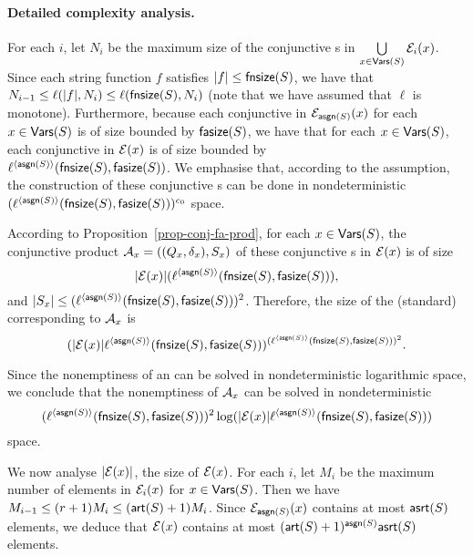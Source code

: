 \paragraph{Detailed complexity analysis.}
For each $i$, 
let $N_i$ be the maximum size of the conjunctive \FA{}s in $\bigcup \limits_{x \in \mathsf{Vars}(S)} \mathcal{E}_i(x)$.
Since each string function $f$ satisfies $|f| \le \mathsf{fnsize}(S)$, we have that $N_{i-1} \le \ell(|f|, N_i) \le \ell(\mathsf{fnsize}(S), N_i)$ (note that we have assumed that $\ell$ is monotone). Furthermore, because each conjunctive \FA{} in $\mathcal{E}_{\mathsf{asgn}(S)}(x)$ for each $x \in \mathsf{Vars}(S)$ is of size bounded by $\mathsf{fasize}(S)$, we have 
    that for each $x \in \mathsf{Vars}(S)$, each conjunctive \FA{} in $\mathcal{E}(x)$ is of
    size bounded by \\ $\ell^{\langle \mathsf{asgn}(S) \rangle}(\mathsf{fnsize}(S), \mathsf{fasize}(S))$. 
%
We emphasise that, according to the \prerec{} assumption, the construction of these conjunctive \FA{}s can be done in nondeterministic $(\ell^{\langle \mathsf{asgn}(S) \rangle}(\mathsf{fnsize}(S), \mathsf{fasize}(S)))^{c_0}$ space. 

According to Proposition~\ref{prop-conj-fa-prod}, for each $x \in \mathsf{Vars}(S)$, the conjunctive product \FA{} $\mathcal{A}_x=((Q_x, \delta_x), S_x)$ of these conjunctive \FA{}s  in $\mathcal{E}(x)$ is of size 
    $$|\mathcal{E}(x)|(\ell^{\langle \mathsf{asgn}(S) \rangle}(\mathsf{fnsize}(S), \mathsf{fasize}(S))),$$
and $|S_x| \le (\ell^{\langle \mathsf{asgn}(S) \rangle}(\mathsf{fnsize}(S), \mathsf{fasize}(S)))^2$. Therefore, the size of the (standard) \FA{} corresponding to $\mathcal{A}_x$ is 
    $$(|\mathcal{E}(x)| \ell^{\langle \mathsf{asgn}(S) \rangle}(\mathsf{fnsize}(S), \mathsf{fasize}(S)))^{(\ell^{\langle \mathsf{asgn}(S) \rangle}(\mathsf{fnsize}(S), \mathsf{fasize}(S)))^2}.$$

Since the nonemptiness of an \FA{} can be solved in nondeterministic logarithmic space, we conclude that the nonemptiness of $\mathcal{A}_x$ can be solved in nondeterministic
{\small
    $$(\ell^{\langle \mathsf{asgn}(S) \rangle}(\mathsf{fnsize}(S), \mathsf{fasize}(S)))^2 
    \log(|\mathcal{E}(x)|\ell^{\langle \mathsf{asgn}(S) \rangle}(\mathsf{fnsize}(S), \mathsf{fasize}(S)))$$
}
space.

We now analyse $|\mathcal{E}(x)|$, the size of $\mathcal{E}(x)$.
For each $i$, let $M_i$ be the maximum number of elements in $\mathcal{E}_i(x)$ for $x  \in \mathsf{Vars}(S)$.
Then we have $M_{i-1} \le (r+1)M_i \le (\mathsf{art}(S)+1)M_i $. Since $\mathcal{E}_{\mathsf{asgn}(S)}(x)$ contains at most $\mathsf{asrt}(S)$ elements, we deduce that $\mathcal{E}(x)$ contains at most $(\mathsf{art}(S)+1)^{\mathsf{asgn}(S)}\mathsf{asrt}(S)$ elements. 

